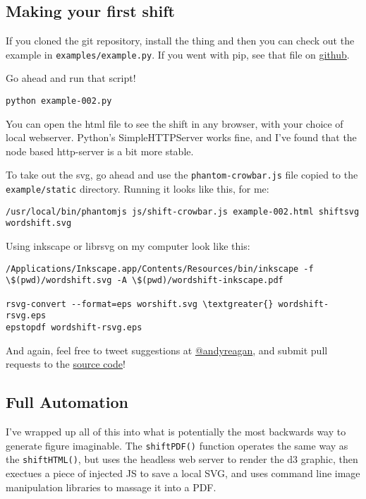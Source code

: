 \subsection{Making your first shift}
\label{wordshifts:making-your-first-shift}
If you cloned the git repository, install the thing and then you can check out the example in \lstinline{examples/example.py}.
If you went with pip, see that file on \href{https://github.com/andyreagan/labMT-simple/blob/master/examples/example.py}{github}.

Go ahead and run that script!
\begin{lstlisting}
python example-002.py
\end{lstlisting}

You can open the html file to see the shift in any browser, with your choice of local webserver.
Python's SimpleHTTPServer works fine, and I've found that the node based http-server is a bit more stable.

To take out the svg, go ahead and use the \lstinline{phantom-crowbar.js} file copied to the \lstinline{example/static} directory.
Running it looks like this, for me:
\begin{lstlisting}
/usr/local/bin/phantomjs js/shift-crowbar.js example-002.html shiftsvg wordshift.svg
\end{lstlisting}

Using inkscape or librsvg on my computer look like this:
\begin{lstlisting}
/Applications/Inkscape.app/Contents/Resources/bin/inkscape -f \$(pwd)/wordshift.svg -A \$(pwd)/wordshift-inkscape.pdf

rsvg-convert --format=eps worshift.svg \textgreater{} wordshift-rsvg.eps
epstopdf wordshift-rsvg.eps
\end{lstlisting}

And again, feel free to tweet suggestions at \href{https://twitter.com/andyreagan}{@andyreagan}, and submit pull requests to the \href{https://github.com/andyreagan/labMT-simple}{source code}!

\subsection{Full Automation}
\label{wordshifts:full-automation}
I've wrapped up all of this into what is potentially the most backwards way to generate figure imaginable.
The \lstinline{shiftPDF()} function operates the same way as the \lstinline{shiftHTML()}, but uses the headless web server to render the d3 graphic, then exectues a piece of injected JS to save a local SVG, and uses command line image manipulation libraries to massage it into a PDF.

